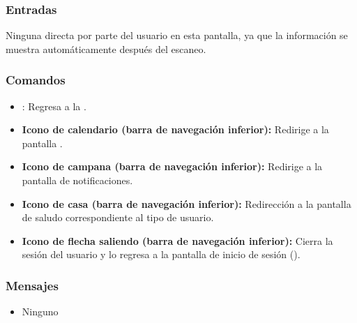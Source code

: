 \subsubsection{Entradas}
Ninguna directa por parte del usuario en esta pantalla, ya que la información se muestra automáticamente después del escaneo.

\subsubsection{Comandos}
\begin{itemize}
	\item {}: Regresa a la .
	\item \textbf{Icono de calendario (barra de navegación inferior):} Redirige a la pantalla .
	\item \textbf{Icono de campana (barra de navegación inferior):} Redirige a la pantalla de notificaciones.
	\item \textbf{Icono de casa (barra de navegación inferior):} Redirección a la pantalla de saludo correspondiente al tipo de usuario.
	\item \textbf{Icono de flecha saliendo (barra de navegación inferior):} Cierra la sesión del usuario y lo regresa a la pantalla de inicio de sesión ().
\end{itemize}

\subsubsection{Mensajes}
\begin{itemize}
	\item Ninguno
\end{itemize}
